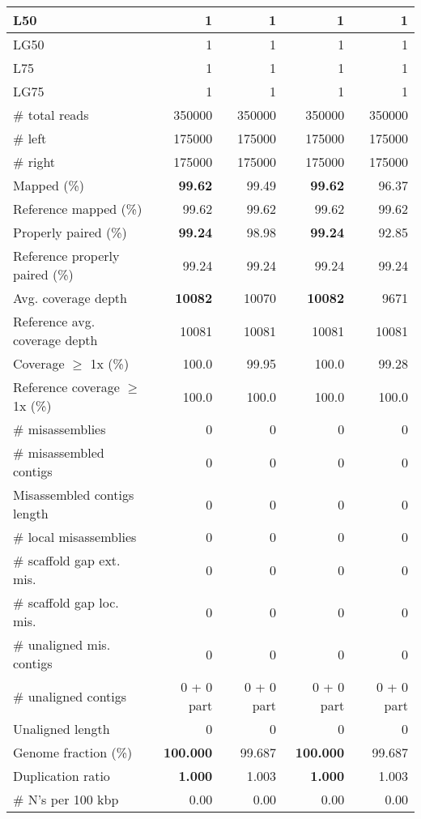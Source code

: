 \documentclass[12pt,a4paper]{article}
\begin{document}
\begin{table}[ht]
\begin{center}
\begin{tabular}{|l*{4}{|r}|}
L50 & 1 & 1 & 1 & 1 \\ \hline
LG50 & 1 & 1 & 1 & 1 \\ \hline
L75 & 1 & 1 & 1 & 1 \\ \hline
LG75 & 1 & 1 & 1 & 1 \\ \hline
\# total reads & 350000 & 350000 & 350000 & 350000 \\ \hline
\# left & 175000 & 175000 & 175000 & 175000 \\ \hline
\# right & 175000 & 175000 & 175000 & 175000 \\ \hline
Mapped (\%) & {\bf 99.62} & 99.49 & {\bf 99.62} & 96.37 \\ \hline
Reference mapped (\%) & 99.62 & 99.62 & 99.62 & 99.62 \\ \hline
Properly paired (\%) & {\bf 99.24} & 98.98 & {\bf 99.24} & 92.85 \\ \hline
Reference properly paired (\%) & 99.24 & 99.24 & 99.24 & 99.24 \\ \hline
Avg. coverage depth & {\bf 10082} & 10070 & {\bf 10082} & 9671 \\ \hline
Reference avg. coverage depth & 10081 & 10081 & 10081 & 10081 \\ \hline
Coverage $\geq$ 1x (\%) & 100.0 & 99.95 & 100.0 & 99.28 \\ \hline
Reference coverage $\geq$ 1x (\%) & 100.0 & 100.0 & 100.0 & 100.0 \\ \hline
\# misassemblies & 0 & 0 & 0 & 0 \\ \hline
\# misassembled contigs & 0 & 0 & 0 & 0 \\ \hline
Misassembled contigs length & 0 & 0 & 0 & 0 \\ \hline
\# local misassemblies & 0 & 0 & 0 & 0 \\ \hline
\# scaffold gap ext. mis. & 0 & 0 & 0 & 0 \\ \hline
\# scaffold gap loc. mis. & 0 & 0 & 0 & 0 \\ \hline
\# unaligned mis. contigs & 0 & 0 & 0 & 0 \\ \hline
\# unaligned contigs & 0 + 0 part & 0 + 0 part & 0 + 0 part & 0 + 0 part \\ \hline
Unaligned length & 0 & 0 & 0 & 0 \\ \hline
Genome fraction (\%) & {\bf 100.000} & 99.687 & {\bf 100.000} & 99.687 \\ \hline
Duplication ratio & {\bf 1.000} & 1.003 & {\bf 1.000} & 1.003 \\ \hline
\# N's per 100 kbp & 0.00 & 0.00 & 0.00 & 0.00 \\ \hline

\end{tabular}
\end{center}
\end{table}
\end{document}
